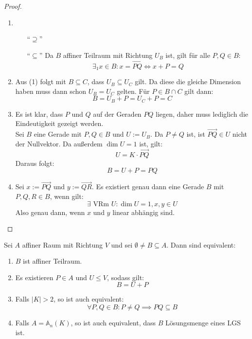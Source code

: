 \documentclass[parskip,a4paper,twoside,DIV15,BCOR12mm]{scrbook}
\begin{document}
\begin{proof}
\begin{enumerate}
\item 
\begin{enumerate}
\item["`$\supseteq$"']\checkmark
\item["`$\subseteq$"'] Da $B$ affiner Teilraum mit Richtung $U_B$ ist, gilt für alle $P,Q\in B$:
\[\exists_1 x\in B: x=\overrightarrow{PQ} \iff x+P = Q\]
\end{enumerate}
\item Aus (1) folgt mit $B\subseteq C$, dass $U_B\subseteq U_C$ gilt. Da diese die
gleiche Dimension haben muss dann schon $U_B=U_C$ gelten. Für $P\in B\cap C$ gilt dann:
\[B=U_B+P=U_C+P=C\]
\item Es ist klar, dass $P$ und $Q$ auf der Geraden $PQ$ liegen, daher muss lediglich die
Eindeutigkeit gezeigt werden.\\
Sei $B$ eine Gerade mit $P,Q\in B$ und $U:=U_B$. Da $P\ne Q$ ist, 
ist $\overrightarrow{PQ}\in U$ nicht der Nullvektor. Da außerdem $\dim U=1$ ist, gilt:
\[U=K\cdot\overrightarrow{PQ}\]
Daraus folgt:
\[B=U+P=PQ\]
\item Sei $x:=\overrightarrow{PQ}$ und $y:=\overrightarrow{QR}$. Es existiert genau dann
eine Gerade $B$ mit $P,Q,R\in B$, wenn gilt:
\[\exists\text{ VRm }U: \dim U=1, x,y\in U\]
Also genau dann, wenn $x$ und $y$ linear abhängig sind.
\end{enumerate}
\end{proof}

\begin{theo}[Teilraumkriterium]
Sei $A$ affiner Raum mit Richtung $V$ und sei $\emptyset \ne B\subseteq A$. Dann 
sind equivalent:
\begin{enumerate}
\item $B$ ist affiner Teilraum.
\item Es existieren $P\in A$ und $U\le V$, sodass gilt:
\[B=U+P\]
\item Falls $|K| >2$, so ist auch equivalent:
\[\forall P,Q\in B: P\ne Q \implies PQ \subseteq B\]
\item Falls $A=\mathbb{A}_n(K)$, so ist auch equivalent, dass $B$ Lösungsmenge eines LGS ist.
\end{enumerate}
\end{theo}
\end{document}
